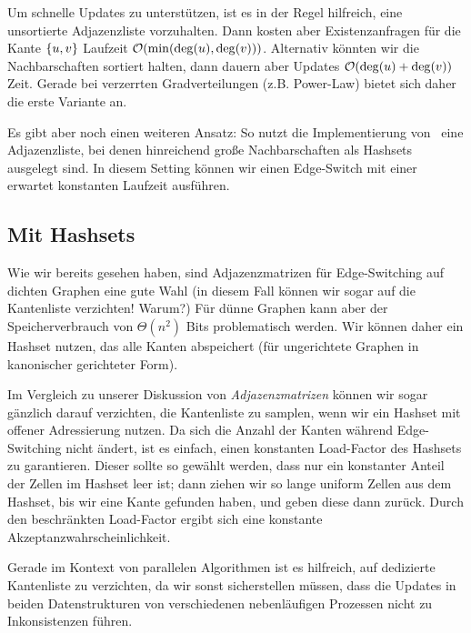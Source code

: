 Um schnelle Updates zu unterstützen, ist es in der Regel hilfreich, eine unsortierte Adjazenzliste vorzuhalten.
Dann kosten aber Existenzanfragen für die Kante $\left\{u,v\right\}$ Laufzeit $\mathcal{O}\!\left(\min(\deg(u), \deg(v))\right)$.
Alternativ könnten wir die Nachbarschaften sortiert halten, dann dauern aber Updates $\mathcal{O}\!\left(\deg(u) + \deg(v)\right)$ Zeit.
Gerade bei verzerrten Gradverteilungen (z.B. Power-Law) bietet sich daher die erste Variante an.

Es gibt aber noch einen weiteren Ansatz: So nutzt die Implementierung von~\cite{DBLP:journals/compnet/VigerL16} eine Adjazenzliste, bei denen hinreichend große Nachbarschaften als Hashsets ausgelegt sind.
In diesem Setting können wir einen Edge-Switch mit einer erwartet konstanten Laufzeit ausführen.

\subsection{Mit Hashsets}
Wie wir bereits gesehen haben, sind Adjazenzmatrizen für Edge-Switching auf dichten Graphen eine gute Wahl (in diesem Fall können wir sogar auf die Kantenliste verzichten! Warum?)
Für dünne Graphen kann aber der Speicherverbrauch von $\Theta(n^2)$ Bits problematisch werden.
Wir können daher ein Hashset nutzen, das alle Kanten abspeichert (für ungerichtete Graphen in kanonischer gerichteter Form).

Im Vergleich zu unserer Diskussion von \emph{Adjazenzmatrizen} können wir sogar gänzlich darauf verzichten, die Kantenliste zu samplen, wenn wir ein Hashset mit offener Adressierung nutzen.
Da sich die Anzahl der Kanten während Edge-Switching nicht ändert, ist es einfach, einen konstanten Load-Factor des Hashsets zu garantieren.
Dieser sollte so gewählt werden, dass nur ein konstanter Anteil der Zellen im Hashset leer ist;
dann ziehen wir so lange uniform Zellen aus dem Hashset, bis wir eine Kante gefunden haben, und geben diese dann zurück.
Durch den beschränkten Load-Factor ergibt sich eine konstante Akzeptanzwahrscheinlichkeit.

Gerade im Kontext von parallelen Algorithmen ist es hilfreich, auf dedizierte Kantenliste zu verzichten, da wir sonst sicherstellen müssen, dass die Updates in beiden Datenstrukturen von verschiedenen nebenläufigen Prozessen nicht zu Inkonsistenzen führen.




